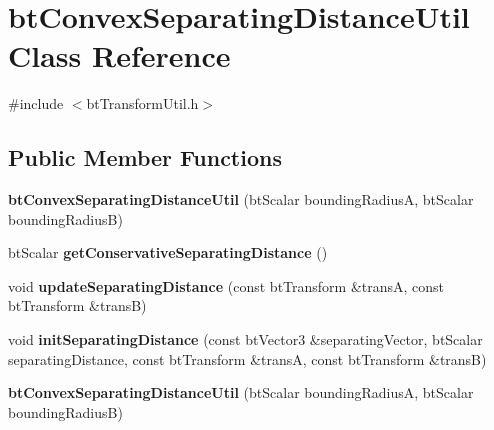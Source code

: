 \hypertarget{classbtConvexSeparatingDistanceUtil}{}\section{bt\+Convex\+Separating\+Distance\+Util Class Reference}
\label{classbtConvexSeparatingDistanceUtil}


{\ttfamily \#include $<$bt\+Transform\+Util.\+h$>$}

\subsection*{Public Member Functions}
\begin{DoxyCompactItemize}
\item 
\mbox{\label{classbtConvexSeparatingDistanceUtil_adb439e310a7a71ab9cee60ae7fb768e4}} 
{\bfseries bt\+Convex\+Separating\+Distance\+Util} (bt\+Scalar bounding\+RadiusA, bt\+Scalar bounding\+RadiusB)
\item 
\mbox{\label{classbtConvexSeparatingDistanceUtil_a9df92aa108854cb282454e9e1ab65b68}} 
bt\+Scalar {\bfseries get\+Conservative\+Separating\+Distance} ()
\item 
\mbox{\label{classbtConvexSeparatingDistanceUtil_af180e70e0e9c8a2c70445b43884be8a3}} 
void {\bfseries update\+Separating\+Distance} (const bt\+Transform \&transA, const bt\+Transform \&transB)
\item 
\mbox{\label{classbtConvexSeparatingDistanceUtil_abb096b617a35cec57c2a7fdb24babfbf}} 
void {\bfseries init\+Separating\+Distance} (const bt\+Vector3 \&separating\+Vector, bt\+Scalar separating\+Distance, const bt\+Transform \&transA, const bt\+Transform \&transB)
\item 
\mbox{\label{classbtConvexSeparatingDistanceUtil_adb439e310a7a71ab9cee60ae7fb768e4}} 
{\bfseries bt\+Convex\+Separating\+Distance\+Util} (bt\+Scalar bounding\+RadiusA, bt\+Scalar bounding\+RadiusB)
\item 
\mbox{\label{classbtConvexSeparatingDistanceUtil_a9df92aa108854cb282454e9e1ab65b68}} 

\end{DoxyCompactItemize}
